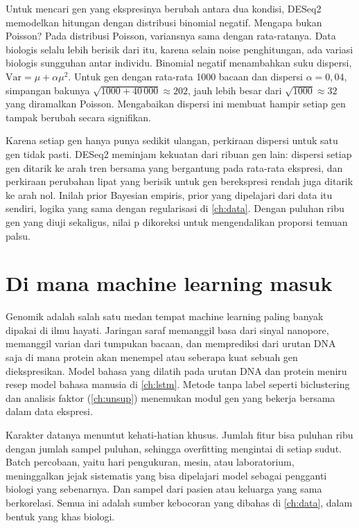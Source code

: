 Untuk mencari gen yang ekspresinya berubah antara dua kondisi, DESeq2 \citep{love2014} memodelkan hitungan dengan
distribusi binomial negatif. Mengapa bukan Poisson? Pada distribusi Poisson, variansnya sama dengan rata-ratanya. Data
biologis selalu lebih berisik dari itu, karena selain noise penghitungan, ada variasi biologis sungguhan antar individu.
Binomial negatif menambahkan suku dispersi, $\mathrm{Var}=\mu+\alpha\mu^2$. Untuk gen dengan rata-rata 1000 bacaan dan
dispersi $\alpha=0{,}04$, simpangan bakunya $\sqrt{1000+40\,000}\approx202$, jauh lebih besar dari $\sqrt{1000}\approx32$
yang diramalkan Poisson. Mengabaikan dispersi ini membuat hampir setiap gen tampak berubah secara signifikan.

Karena setiap gen hanya punya sedikit ulangan, perkiraan dispersi untuk satu gen tidak pasti. DESeq2 meminjam
kekuatan dari ribuan gen lain: dispersi setiap gen ditarik ke arah tren bersama yang bergantung pada rata-rata ekspresi,
dan perkiraan perubahan lipat yang berisik untuk gen berekspresi rendah juga ditarik ke arah nol. Inilah prior
Bayesian empiris, prior yang dipelajari dari data itu sendiri, logika yang sama dengan regularisasi di \cref{ch:data}.
Dengan puluhan ribu gen yang diuji sekaligus, nilai p dikoreksi untuk mengendalikan proporsi temuan palsu.

\section{Di mana machine learning masuk}

Genomik adalah salah satu medan tempat machine learning paling banyak dipakai di ilmu hayati. Jaringan saraf memanggil
basa dari sinyal nanopore, memanggil varian dari tumpukan bacaan, dan memprediksi dari urutan DNA saja di mana protein
akan menempel atau seberapa kuat sebuah gen diekspresikan. Model bahasa yang dilatih pada urutan DNA dan protein meniru
resep model bahasa manusia di \cref{ch:lstm}. Metode tanpa label seperti biclustering dan analisis faktor (\cref{ch:unsup})
menemukan modul gen yang bekerja bersama dalam data ekspresi.

Karakter datanya menuntut kehati-hatian khusus. Jumlah fitur bisa puluhan ribu dengan jumlah sampel puluhan, sehingga
overfitting mengintai di setiap sudut. Batch percobaan, yaitu hari pengukuran, mesin, atau laboratorium, meninggalkan jejak
sistematis yang bisa dipelajari model sebagai pengganti biologi yang sebenarnya. Dan sampel dari pasien atau keluarga yang
sama berkorelasi. Semua ini adalah sumber kebocoran yang dibahas di \cref{ch:data}, dalam bentuk yang khas biologi.

